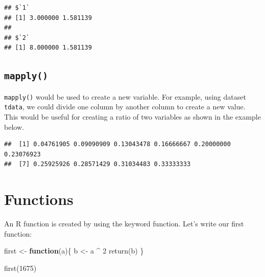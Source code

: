 \documentclass[
]{book}
\newenvironment{Shaded}{\begin{snugshade}}{\end{snugshade}}
\newcommand{\ControlFlowTok}[1]{\textcolor[rgb]{0.13,0.29,0.53}{\textbf{#1}}}
\newcommand{\DecValTok}[1]{\textcolor[rgb]{0.00,0.00,0.81}{#1}}
\newcommand{\FunctionTok}[1]{\textcolor[rgb]{0.00,0.00,0.00}{#1}}
\newcommand{\NormalTok}[1]{#1}
\newcommand{\OtherTok}[1]{\textcolor[rgb]{0.56,0.35,0.01}{#1}}
\newcommand{\SpecialCharTok}[1]{\textcolor[rgb]{0.00,0.00,0.00}{#1}}
\begin{document}
\begin{verbatim}
## $`1`
## [1] 3.000000 1.581139
## 
## $`2`
## [1] 8.000000 1.581139
\end{verbatim}

\hypertarget{mapply}{%
\subsection{\texorpdfstring{\texttt{mapply()}}{mapply()}}\label{mapply}}

\texttt{mapply()} would be used to create a new variable. For example, using dataset \texttt{tdata}, we could divide one column by another column to create a new value. This would be useful for creating a ratio of two variables as shown in the example below.

\begin{Shaded}
\end{Shaded}

\begin{verbatim}
##  [1] 0.04761905 0.09090909 0.13043478 0.16666667 0.20000000 0.23076923
##  [7] 0.25925926 0.28571429 0.31034483 0.33333333
\end{verbatim}

\hypertarget{functions}{%
\section{Functions}\label{functions}}

An R function is created by using the keyword function. Let's write our first function:

\begin{Shaded}
\begin{Highlighting}[]
\NormalTok{first }\OtherTok{\textless{}{-}} \ControlFlowTok{function}\NormalTok{(a)\{}
\NormalTok{  b }\OtherTok{\textless{}{-}}\NormalTok{ a }\SpecialCharTok{\^{}} \DecValTok{2}
  \FunctionTok{return}\NormalTok{(b)}
\NormalTok{\}}

\FunctionTok{first}\NormalTok{(}\DecValTok{1675}\NormalTok{)}
\end{Highlighting}
\end{Shaded}
\end{document}
